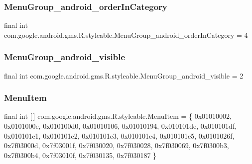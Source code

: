 \subsubsection{\texorpdfstring{Menu\+Group\+\_\+android\+\_\+order\+In\+Category}{MenuGroup\_android\_orderInCategory}}
{\footnotesize\ttfamily final int com.\+google.\+android.\+gms.\+R.\+styleable.\+Menu\+Group\+\_\+android\+\_\+order\+In\+Category = 4\hspace{0.3cm}{\ttfamily [static]}}

\mbox{\label{classcom_1_1google_1_1android_1_1gms_1_1R_1_1styleable_a8642e3016f1d1a7b9fb7c67e0c444eb4}} 
\subsubsection{\texorpdfstring{Menu\+Group\+\_\+android\+\_\+visible}{MenuGroup\_android\_visible}}
{\footnotesize\ttfamily final int com.\+google.\+android.\+gms.\+R.\+styleable.\+Menu\+Group\+\_\+android\+\_\+visible = 2\hspace{0.3cm}{\ttfamily [static]}}

\mbox{\label{classcom_1_1google_1_1android_1_1gms_1_1R_1_1styleable_a7c676b544f8b0bffbf835502234a7e76}} 
\subsubsection{\texorpdfstring{Menu\+Item}{MenuItem}}
{\footnotesize\ttfamily final int \mbox{[}$\,$\mbox{]} com.\+google.\+android.\+gms.\+R.\+styleable.\+Menu\+Item = \{ 0x01010002, 0x0101000e, 0x010100d0, 0x01010106, 0x01010194, 0x010101de, 0x010101df, 0x010101e1, 0x010101e2, 0x010101e3, 0x010101e4, 0x010101e5, 0x0101026f, 0x7f03000d, 0x7f03001f, 0x7f030020, 0x7f030028, 0x7f030069, 0x7f0300b3, 0x7f0300b4, 0x7f03010f, 0x7f030135, 0x7f030187 \}\hspace{0.3cm}{\ttfamily [static]}}

